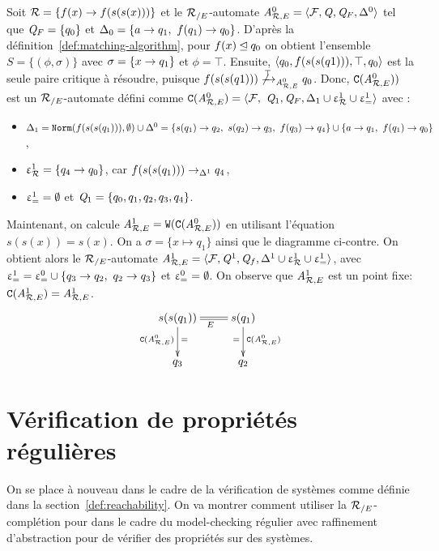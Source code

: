 \begin{example}
  \label{ex:W}
  Soit $\mathcal R = \{f(x) \rightarrow f(s(s(x)))\}$ et le ${\mathcal R_{/E}}$-automate
  ${\mathit A}_{\mathcal R,E}^0 = \langle\mathcal{F},\mathit Q,\mathit Q_F,\Delta^0\rangle$ tel que $\mathit Q_F = \{q_0\}$
  et $\Delta_0 = \{a \rightarrow q_1,\ f(q_1) \rightarrow q_0\}$.
  D'après la définition~\ref{def:matching-algorithm}, pour $f(x) \unlhd q_0$ on obtient l'ensemble $S = \{(\phi,\sigma)\}$
  avec $\sigma = \{x \rightarrow q_1\}$ et $\phi = \top$. Ensuite,
  $\langle q_0, f(s(s(q1))), \top, q_0\rangle$ est la seule paire critique à résoudre, puisque 
  $f(s(s(q1))) \not\xrightarrow{\top}_{{\mathit A}_{\mathcal R,E}^0} q_0$. Donc, $\mathtt{C}({\mathit A}_{\mathcal R,E}^0))$ est un ${\mathcal R_{/E}}$-automate défini comme
  $\mathtt{C}({\mathit A}_{\mathcal R,E}^0) = \langle\mathcal{F},\ \mathit Q_1, \mathit Q_F, \Delta_1 \cup \upvarepsilon_{\mathcal R}^1 \cup \upvarepsilon_{=}^1 \rangle$ avec :
  \begin{itemize}
  \item  $\Delta_1 = \mathtt{Norm}(f(s(s(q_1))),\emptyset) \cup \Delta^0 =
    \{s(q_1) \rightarrow q_2,\ s(q_2) \rightarrow q_3,\ f(q_3) \rightarrow q_4\} \cup \{a \rightarrow q_1,\ f(q_1) \rightarrow q_0\}$,
  \item
    $\upvarepsilon_{\mathcal R}^1 = \{q_4 \rightarrow q_0\}$, car $f(s(s(q_1))) \rightarrow_{\Delta^1} q_4$,
  \item $\upvarepsilon_{=}^1 = \emptyset$ et $\mathit Q_1 = \{q_0,q_1,q_2,q_3,q_4\}$.
  \end{itemize}

  Maintenant, on calcule ${\mathit A}_{\mathcal R,E}^1 = \mathtt{W}(\mathtt{C}({\mathit A}_{\mathcal R,E}^0))$ en utilisant l'équation
  $s(s(x))=s(x)$.  On a $\sigma=\{x \mapsto q_1\}$ ainsi que le diagramme ci-contre.
  On obtient alors le ${\mathcal R_{/E}}$-automate ${\mathit A}_{\mathcal R,E}^1 = \langle \mathcal{F}, \mathit Q^1, \mathit Q_f, \Delta^1 \cup \upvarepsilon_{\mathcal R}^1 \cup \upvarepsilon_{=}^1\rangle$,
  avec $\upvarepsilon_{=}^1= \upvarepsilon_{=}^0 \cup \{q_3 \rightarrow q_2,\ q_2 \rightarrow q_3\}$ et $\upvarepsilon_{=}^0=\emptyset$.  On observe que ${\mathit A}_{\mathcal R,E}^1$
  est un point fixe: $\mathtt{C}({\mathit A}_{\mathcal R,E}^1) = {\mathit A}_{\mathcal R,E}^1$.
  \[\xymatrix{
    s(s(q_1)) \ar@{=}[r]_{E}\ar[d]^{=}_{\compl(\aaexeq^0)} & s(q_1) \ar[d]^{\compl(\aaexeq^0)}_{=}\\
    q_3 & q_2
  }\]
\end{example}


\section{Vérification de propriétés régulières}
On se place à nouveau dans le cadre de la vérification de systèmes comme définie dans la section~\ref{def:reachability}.
On va montrer comment utiliser la ${\mathcal R_{/E}}$-complétion pour dans le cadre du model-checking régulier 
avec raffinement d'abstraction pour de vérifier des propriétés sur des systèmes.

